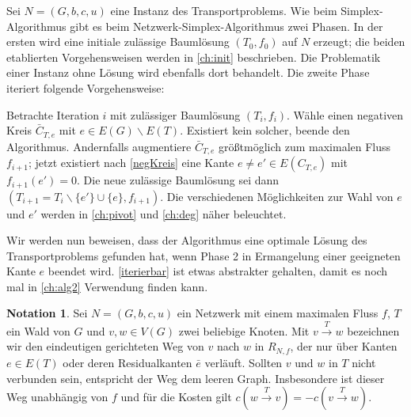 \documentclass[a4paper,twoside,ngerman]{report}
\theoremstyle{plain}
\theoremstyle{definition}
\newtheorem*{nota}{Notation}
\begin{document}
Sei $N=(G,b,c,u)$ eine Instanz des Transportproblems. Wie beim Simplex-Algorithmus gibt es beim Netzwerk-Simplex-Algorithmus zwei Phasen. In der ersten wird eine initiale zulässige Baumlösung $(T_0,f_0)$ auf $N$ erzeugt; die beiden etablierten Vorgehensweisen werden in \cref{ch:init} beschrieben. Die Problematik einer Instanz ohne Lösung wird ebenfalls dort behandelt. Die zweite Phase iteriert folgende Vorgehensweise:

Betrachte Iteration $i$ mit zulässiger Baumlösung $(T_i,f_i)$. Wähle einen negativen Kreis $\bar{C}_{T,e}$ mit $e\in E(G)\backslash E(T)$. Existiert kein solcher, beende den Algorithmus. Andernfalls augmentiere $\bar{C}_{T,e}$ größtmöglich zum maximalen Fluss $f_{i+1}$; jetzt existiert nach \cref{negKreis} eine Kante $e\neq e'\in E(C_{T,e})$ mit $f_{i+1}(e')=0$. Die neue zulässige Baumlösung sei dann $(T_{i+1}=T_i\backslash\{e'\}\cup\{e\},f_{i+1})$. Die verschiedenen Möglichkeiten zur Wahl von $e$ und $e'$ werden in \cref{ch:pivot} und \cref{ch:deg} näher beleuchtet.

Wir werden nun beweisen, dass der Algorithmus eine optimale Lösung des Transportproblems gefunden hat, wenn Phase 2 in Ermangelung einer geeigneten Kante $e$ beendet wird. \cref{iterierbar} ist etwas abstrakter gehalten, damit es noch mal in \cref{ch:alg2} Verwendung finden kann.

\begin{nota}Sei $N=(G,b,c,u)$ ein Netzwerk mit einem maximalen Fluss $f$, $T$ ein Wald von $G$ und $v,w\in V(G)$ zwei beliebige Knoten. Mit $v\xrightarrow{T}w$ bezeichnen wir den eindeutigen gerichteten Weg von $v$ nach $w$ in $R_{N,f}$, der nur über Kanten $e\in E(T)$ oder deren Residualkanten $\bar{e}$ verläuft. Sollten $v$ und $w$ in $T$ nicht verbunden sein, entspricht der Weg dem leeren Graph. Insbesondere ist dieser Weg unabhängig von $f$ und für die Kosten gilt $c(w\xrightarrow{T}v) = -c(v\xrightarrow{T}w)$.\end{nota}
\end{document}
